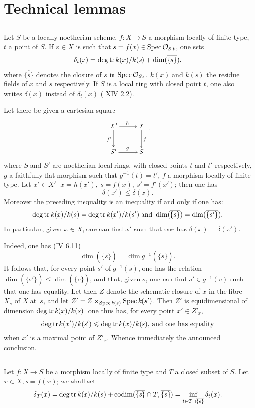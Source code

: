 \section{Technical lemmas} \label{XIV.2}

\subsection{} \label{XIV.2.1}
Let $S$ be a locally noetherian scheme, $f:X\to S$ a morphism locally of finite type, $t$ a point of $S$. If $x\in X$ is such that $s=f(x)\in\operatorname{Spec}{\mathcal O}_{S, t}$, one sets
$$
\delta_t(x)=\operatorname{deg\,tr} k(x)/k(s)+\dim(\overline{\{s\}}),
$$
where $\overline{\{s\}}$ denotes the closure of $s$ in $\operatorname{Spec}{\mathcal O}_{S, t}$, $k(x)$ and $k(s)$ the residue fields of $x$ and $s$ respectively. If $S$ is a local ring with closed point $t$, one also writes $\delta(x)$ instead of $\delta_t(x)$ (\cf {} XIV 2.2).
\begin{sublemma} \label{XIV.2.1.1} Let there be given a cartesian square
$$
\xymatrix{X'\ar[r]^{h}\ar[d]_{f'}&X\ar[d]^f\\S'\ar[r]^g&S},
$$
where $S$ and $S'$ are noetherian local rings, with closed points $t$ and $t'$ respectively, $g$ a faithfully flat morphism such that $g^{-1}(t)=t'$, $f$ a morphism locally of finite type. Let $x'\in X',\ x=h(x'),\ s=f(x),\ s'=f'(x')$; then one has
$$
\delta(x')\leq\delta(x).
$$
Moreover the preceding inequality is an inequality if and only if one has:
$$
\operatorname{deg\,tr} k(x)/k(s)=\operatorname{deg\,tr} k(x')/k(s')\text{ and }\dim(\overline{\{s\}})=\dim(\overline{\{s'\}}).
$$
In particular, given $x\in X$, one can find $x'$ such that one has $\delta(x)=\delta(x')$.
\end{sublemma}

Indeed, one has (\EGA IV 6.11)
$$
\dim(\overline{\{s\}})=\dim g^{-1}(\overline{\{s\}}).
$$
It follows that, for every point $s'$ of $g^{-1}(s)$, one has the relation $\dim(\overline{\{s'\}})\leq \dim(\overline{\{s\}})$, and that, given $s$, one can find $s'\in g^{-1}(s)$ such that one has equality. Let then $Z$ denote the schematic closure of $x$ in the fibre $X_s$ of $X$ at~$s$, and let $Z'=Z\times_{\operatorname{Spec} k(s)}\operatorname{Spec} k(s')$. Then $Z'$ is equidimensional of dimension $\operatorname{deg\,tr} k(x)/k(s)$; one thus has, for every point $x'\in Z'_{x}$,
$$
\operatorname{deg\,tr} k(x')/k(s')\leqslant\operatorname{deg\,tr} k(x)/k(s)\text{, and one has equality}$$
when $x'$ is a maximal point of $Z'_x$. Whence immediately the announced conclusion.

\subsection{} \label{XIV.2.2} Let $f:X\to S$ be a morphism locally of finite type and $T$ a closed subset of $S$. Let $x\in X, s=f(x)$; we shall set
$$
\delta_T(x)=\operatorname{deg\,tr} k(x)/k(s)+\operatorname{codim}(\overline{\{s\}}\cap T, \overline{\{s\}})=\inf_{t\in T\cap\overline{\{s\}}}\delta_t(x).
$$

